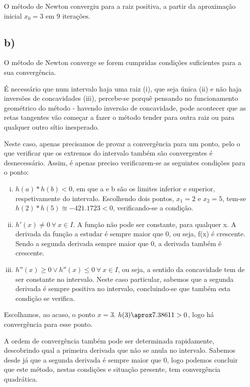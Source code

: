 \documentclass[a4paper, 18pt]{article}
\begin{document}
	\par
	O método de Newton convergiu para a raiz positiva, a partir da aproximação inicial $x_0 = 3$ em 9 iterações.

\subsection*{b)}
	\par
	O método de Newton converge se forem cumpridas condições suficientes para a sua convergência.

	\par
	É necessário que num intervalo haja uma raiz (i), que seja única (ii) e não haja inversões de concavidades (iii),
	percebe-se porquê pensando no funcionamento geométrico do método - havendo inversão de concavidade, pode
	acontecer que as retas tangentes vão começar a fazer o método tender para outra raiz ou para qualquer outro sítio inesperado.

	Neste caso, apenas precisamos de provar a convergência para um ponto, pelo o que verificar que os extremos do intervalo também são convergentes é desnecessário. Assim, é apenas preciso verificarem-se as seguintes condições para o ponto:

	\begin{enumerate}[i)]
	\item $h(a)*h(b) < 0$, em que a e b são os limites inferior e superior, respetivamente do intervalo.
	Escolhendo dois pontos, $x_1 = 2$ e $x_2 = 5$, tem-se $h(2) * h(5) \approxeq -421.1723 < 0 $, verificando-se a condição.

	\item $h'(x) \neq 0 \> \forall \> x \in I$. A função não pode ser constante, para qualquer x.
	A derivada da função a estudar é sempre maior que 0, ou seja, f(x) é crescente. Sendo a segunda derivada sempre maior que 0, a derivada também é crescente.

	\item $h''(x) \geqslant 0 \vee h''(x) \leqslant 0 \> \forall \> x \in I$, ou seja, a sentido da concavidade tem de ser constante no intervalo.
	Neste caso particular, sabemos que a segunda derivada é sempre positiva no intervalo, concluindo-se que também esta condição se verifica.
	\end{enumerate}

	Escolhamos, ao acaso, o ponto $x = 3$. $h(3) \aprox 7.38611 > 0$, logo há convergência para esse ponto.

	A ordem de convergência também pode ser determinada rapidamente, descobrindo qual a primeira derivada que não se anula no intervalo. Sabemos desde já que a segunda derivada é sempre maior que 0, logo podemos concluir que este método, nestas condições e situação presente, tem convergência quadrática.
\end{document}
